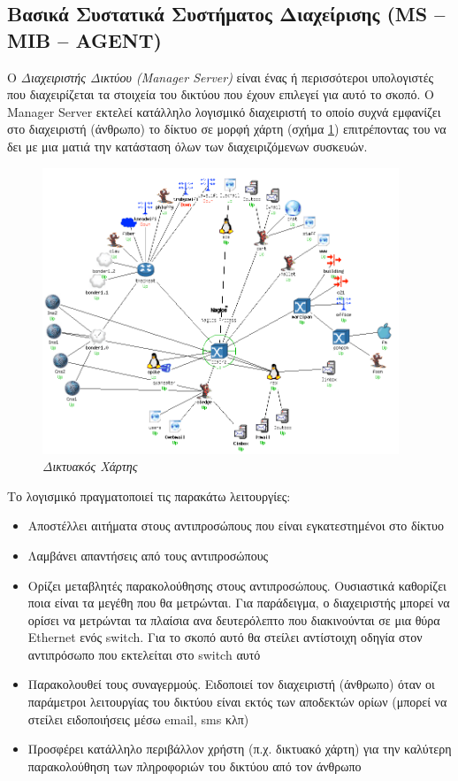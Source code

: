 %
%
\subsection{Βασικά Συστατικά Συστήματος Διαχείρισης (MS -- MIB -- AGENT)}

\begin{inthebox}
Ο \emph{Διαχειριστής Δικτύου (Manager Server)} είναι ένας ή περισσότεροι υπολογιστές που διαχειρίζεται τα στοιχεία του δικτύου που έχουν επιλεγεί για αυτό το σκοπό. Ο Manager Server εκτελεί κατάλληλο λογισμικό διαχειριστή το οποίο συχνά εμφανίζει στο διαχειριστή (άνθρωπο) το δίκτυο σε μορφή χάρτη (σχήμα \ref{7-2}) επιτρέποντας του να δει με μια ματιά την κατάσταση όλων των διαχειριζόμενων συσκευών.\\
\end{inthebox}

\begin{figure}[!ht]
 \centering
 \includegraphics[width=0.95\textwidth]{images/chapter7/7-2}
 \caption {\textsl{Δικτυακός Χάρτης}}
 \label{7-2}
\end{figure}

Το λογισμικό πραγματοποιεί τις παρακάτω λειτουργίες:

\begin{itemize}
\item Αποστέλλει αιτήματα στους αντιπροσώπους που είναι εγκατεστημένοι στο δίκτυο
\item Λαμβάνει απαντήσεις από τους αντιπροσώπους
\item Ορίζει μεταβλητές παρακολούθησης στους αντιπροσώπους. Ουσιαστικά καθορίζει ποια είναι τα μεγέθη που θα μετρώνται. Για παράδειγμα, ο διαχειριστής μπορεί να ορίσει να μετρώνται τα πλαίσια ανα δευτερόλεπτο που διακινούνται σε μια θύρα Ethernet ενός switch. Για το σκοπό αυτό θα στείλει αντίστοιχη οδηγία στον αντιπρόσωπο που εκτελείται στο switch αυτό
\item Παρακολουθεί τους συναγερμούς. Ειδοποιεί τον διαχειριστή (άνθρωπο) όταν οι παράμετροι λειτουργίας του δικτύου είναι εκτός των αποδεκτών ορίων (μπορεί να στείλει ειδοποιήσεις μέσω email, sms κλπ)
\item Προσφέρει κατάλληλο περιβάλλον χρήστη (π.χ. δικτυακό χάρτη) για την καλύτερη παρακολούθηση των πληροφοριών του δικτύου από τον άνθρωπο
\end{itemize}


